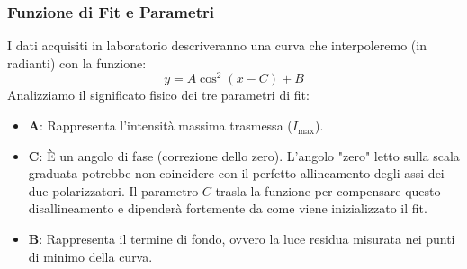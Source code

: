 \documentclass[openany,a4paper,12pt]{book}
\begin{document}
\begin{center}

\end{center}

\subsubsection*{Funzione di Fit e Parametri}
I dati acquisiti in laboratorio descriveranno una curva che interpoleremo (in radianti) con la funzione:
\begin{equation}
    y = A \cos^2(x - C) + B
\end{equation}
Analizziamo il significato fisico dei tre parametri di fit:
\begin{itemize}
    \item $\mathbf{A}$: Rappresenta l'intensità massima trasmessa ($I_{\text{max}}$).
    \item $\mathbf{C}$: È un angolo di fase (correzione dello zero). L'angolo "zero" letto sulla scala graduata potrebbe non coincidere con il perfetto allineamento degli assi dei due polarizzatori. Il parametro $C$ trasla la funzione per compensare questo disallineamento e dipenderà fortemente da come viene inizializzato il fit.
    \item $\mathbf{B}$: Rappresenta il termine di fondo, ovvero la luce residua misurata nei punti di minimo della curva.
\end{itemize}
\end{document}
